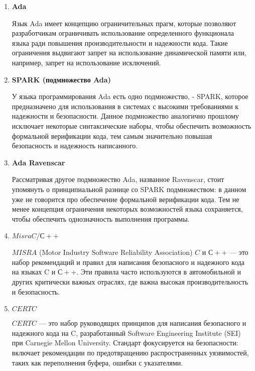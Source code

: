 \documentclass{mipt-thesis-bs}
\begin{document}
\begin{enumerate}
        \item \textbf{Ada}

        Язык Ada имеет концепцию ограничительных прагм, которые позволяют разработчикам ограничивать
        использование определенного функционала языка ради повышения производительности и надежности
        кода. Такие ограничения выдвигают запрет на использование динамической памяти или, например,
        запрет на использование исключений.

        \item \textbf{SPARK (подмножество Ada)}

        У языка программирования Ada есть одно подмножество, - SPARK, которое предназначено для
        использования в системах с высокими требованиями к надежности и безопасности. Данное
        подмножество аналогично прошлому исключает некоторые синтаксические наборы, чтобы
        обеспечить возможность формальной верификации кода, тем самым значительно повышая
        безопасность и надежность написанного.

        \item \textbf{Ada Ravenscar}

        Рассматривая другое подмножество Ada, названное Ravenscar, стоит упомянуть о принципиальной
        разнице со SPARK подмножеством: в данном уже не говорится про обеспечение формальной верификации
        кода. Тем не менее концепция ограничения некоторых возможностей языка сохраняется, чтобы
        обеспечить однозначность выполнения программы.

        \item \textbf{$Misra C/С++$}

        $MISRA$ (Motor Industry Software Reliability Association) $C$ и $С++$ — это набор
        рекомендаций и правил для написания безопасного и надежного кода на
        языках C и $С++$. Эти правила часто используются в автомобильной и
        других критически важных отраслях, где важна высокая производительность и безопасность.

        \item \textbf{$CERT C$}

        $CERT C$ — это набор руководящих принципов для написания безопасного и надежного 
        кода на C, разработанный Software Engineering Institute (SEI) при Carnegie Mellon University.
        Стандарт фокусируется на безопасности: включает рекомендации по предотвращению
        распространенных уязвимостей, таких как переполнения буфера, ошибки с указателями.


\end{enumerate}
\end{document}
